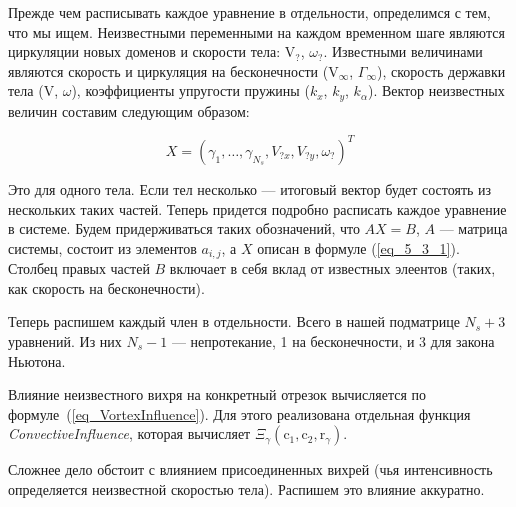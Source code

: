 \documentclass[14pt]{extreport}
\newcommand{\br}[1]{\boldsymbol{\mathrm{#1}}}
\renewcommand{\vec}[1]{\br{#1}}
\begin{document}
Прежде чем расписывать каждое уравнение в отдельности, определимся с тем, что мы ищем. Неизвестными переменными на каждом временном шаге являются циркуляции новых доменов и скорости тела: $\vec V_?$, $\omega_?$. Известными величинами являются скорость и циркуляция на бесконечности ($\vec V_\infty$, $\Gamma_\infty$), скорость державки тела ($\vec V$, $\omega$), коэффициенты упругости пружины ($k_x$, $k_y$, $k_\alpha$). Вектор неизвестных величин составим следующим образом:

\begin{equation}
\label{eq_5_3_1}
X = (\gamma_1, \dotsc, \gamma_{N_s}, V_{?x}, V_{?y}, \omega_?)^T
\end{equation}

Это для одного тела. Если тел несколько --- итоговый вектор будет состоять из нескольких таких частей. Теперь придется подробно расписать каждое уравнение в системе. Будем придерживаться таких обозначений, что $AX = B$, $A$ --- матрица системы, состоит из элементов $a_{i,j}$, а $X$ описан в формуле (\ref{eq_5_3_1}). Столбец правых частей $B$ включает в себя вклад от известных элеентов (таких, как скорость на бесконечности).

Теперь распишем каждый член в отдельности. Всего в нашей подматрице $N_s + 3$ уравнений. Из них $N_s - 1$ --- непротекание, 1 на бесконечности, и 3 для закона Ньютона.

Влияние неизвестного вихря на конкретный отрезок вычисляется по формуле~(\ref{eq_VortexInfluence}). Для этого реализована отдельная функция \emph{ConvectiveInfluence}, которая вычисляет $\Xi_\gamma(\vec c_1, \vec c_2, \vec r_\gamma)$.

Сложнее дело обстоит с влиянием присоединенных вихрей (чья интенсивность определяется неизвестной скоростью тела). Распишем это влияние аккуратно.
\end{document}
